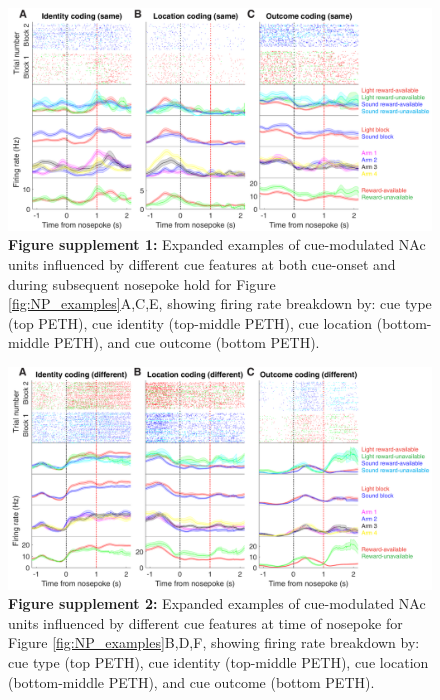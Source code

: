 \documentclass[11pt]{article}
\newcommand{\bsf}[1]{\textbf{#1}}
\begin{document}
 \begin{figure}[ht!]
\centering
\includegraphics[width=\textwidth]{Fig 7 - NP Neural examples SUPP1.pdf}
\caption*{\bsf{Figure supplement 1:} {\color{red} Expanded examples of cue-modulated NAc units influenced by different cue features at both cue-onset and during subsequent nosepoke hold for Figure \ref{fig:NP_examples}A,C,E, showing firing rate breakdown by: cue type (top PETH), cue identity (top-middle PETH), cue location (bottom-middle PETH), and cue outcome (bottom PETH).}}
\label{fig:NP_examplesSUPP1}
\end{figure} \clearpage

 \begin{figure}[ht!]
\centering
\includegraphics[width=\textwidth]{Fig 7 - NP Neural examples SUPP2.pdf}
\caption*{\bsf{Figure supplement 2:} {\color{red} Expanded examples of cue-modulated NAc units influenced by different cue features at time of nosepoke for Figure \ref{fig:NP_examples}B,D,F, showing firing rate breakdown by: cue type (top PETH), cue identity (top-middle PETH), cue location (bottom-middle PETH), and cue outcome (bottom PETH).}}
\label{fig:NP_examplesSUPP2}
\end{figure} \clearpage
\end{document}
